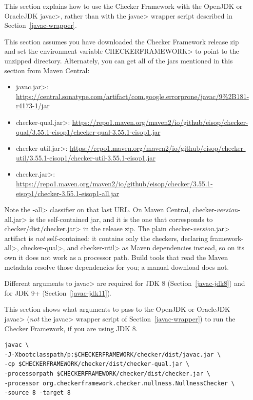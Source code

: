 
This section explains how to use the Checker Framework with the OpenJDK or
OracleJDK \<javac>, rather than with the \<javac> wrapper script described in
Section~\ref{javac-wrapper}.

This
section assumes you have downloaded the Checker Framework release zip and set
the environment variable \<CHECKERFRAMEWORK> to point to the unzipped directory.
Alternately, you can get all of the jars mentioned in this section from Maven Central:

\begin{itemize}
\item \<javac.jar>: \url{https://central.sonatype.com/artifact/com.google.errorprone/javac/9%2B181-r4173-1/jar}
\item \<checker-qual.jar>: \url{https://repo1.maven.org/maven2/io/github/eisop/checker-qual/3.55.1-eisop1/checker-qual-3.55.1-eisop1.jar}
\item \<checker-util.jar>: \url{https://repo1.maven.org/maven2/io/github/eisop/checker-util/3.55.1-eisop1/checker-util-3.55.1-eisop1.jar}
\item \<checker.jar>: \url{https://repo1.maven.org/maven2/io/github/eisop/checker/3.55.1-eisop1/checker-3.55.1-eisop1-all.jar}
\end{itemize}

Note the \<-all> classifier on that last URL.  On Maven Central,
\<checker-\emph{version}-all.jar> is the self-contained jar, and it is the one
that corresponds to \<checker/dist/checker.jar> in the release zip.  The plain
\<checker-\emph{version}.jar> artifact is \emph{not} self-contained: it contains only
the checkers, declaring \<framework-all>, \<checker-qual>, and \<checker-util> as
Maven dependencies instead, so on its own it does not work as a processor path.
Build tools that read the Maven metadata resolve those dependencies for you; a
manual download does not.

Different arguments to \<javac> are required for JDK 8
(Section~\ref{javac-jdk8}) and for JDK 9+ (Section~\ref{javac-jdk11}).



This section shows what arguments to pass to the OpenJDK or OracleJDK
\<javac> (\emph{not} the \<javac> wrapper script of
Section~\ref{javac-wrapper}) to run the Checker
Framework, if you are using JDK 8.

\begin{Verbatim}
javac \
-J-Xbootclasspath/p:$CHECKERFRAMEWORK/checker/dist/javac.jar \
-cp $CHECKERFRAMEWORK/checker/dist/checker-qual.jar \
-processorpath $CHECKERFRAMEWORK/checker/dist/checker.jar \
-processor org.checkerframework.checker.nullness.NullnessChecker \
-source 8 -target 8
\end{Verbatim}

